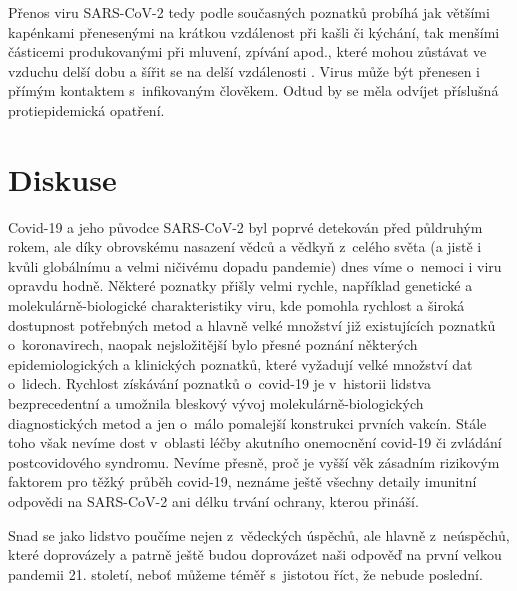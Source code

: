 Přenos viru SARS-CoV-2 tedy podle současných poznatků probíhá jak většími kapénkami přenesenými na krátkou vzdálenost při kašli či kýchání, tak menšími částicemi produkovanými při mluvení, zpívání apod., které mohou zůstávat ve vzduchu delší dobu a šířit se na delší vzdálenosti \cite{Leung:2021}. Virus může být přenesen i přímým kontaktem s~infikovaným člověkem. Odtud by se měla odvíjet příslušná protiepidemická opatření.



\section*{Diskuse}
Covid-19 a jeho původce SARS-CoV-2 byl poprvé detekován před půldruhým rokem, ale díky obrovskému nasazení vědců a vědkyň z~celého světa (a jistě i kvůli globálnímu a velmi ničivému dopadu pandemie) dnes víme o~nemoci i viru opravdu hodně. Některé poznatky přišly velmi rychle, například genetické a molekulárně-biologické charakteristiky viru, kde pomohla rychlost a široká dostupnost potřebných metod a hlavně velké množství již existujících poznatků o~koronavirech, naopak nejsložitější bylo přesné poznání některých epidemiologických a klinických poznatků, které vy\-ža\-du\-jí velké množství dat o~lidech. Rychlost získávání poznatků o~covid-19 je v~historii lidstva bezprecedentní a umožnila bleskový vývoj molekulárně-biologických diagnostických metod a jen o~málo pomalejší konstrukci prvních vakcín. Stále toho však nevíme dost v~oblasti léčby akutního onemocnění covid-19 či zvládání postcovidového syndromu. Nevíme přesně, proč je vyšší věk zásadním rizikovým faktorem pro těžký průběh covid-19, neznáme ještě všechny detaily imunitní odpovědi na SARS-CoV-2 ani délku trvání ochrany, kterou přináší.

Snad se jako lidstvo poučíme nejen z~vědeckých úspěchů, ale hlavně z~neúspěchů, které doprovázely a patrně ještě budou doprovázet naši odpověď na první velkou pandemii 21. století, neboť můžeme téměř s~jistotou říct, že nebude poslední.

